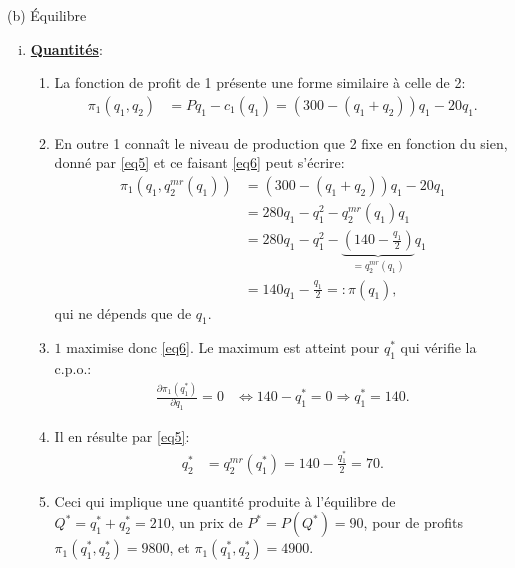 \begin{frame}[allowframebreaks]{(b) Équilibre}
    \begin{enumerate}[(i)]
        \item \textbf{\underline{Quantités}}: 
        \begin{enumerate}[-]
            \item La fonction de profit de 1 présente une forme similaire à celle de 2:
            \begin{align}
                \pi_1\left(q_1, q_2\right) &= Pq_1 - c_1(q_1) = \left(300-(q_1+q_2)\right)q_1 - 20q_1.
                \label{eq6}
            \end{align}
            \item En outre 1 connaît le niveau de production que 2 fixe en fonction du sien, 
            donné par \eqref{eq5} et ce faisant \eqref{eq6} peut s'écrire:
            \begin{align}
                \pi_1\left(q_1, q^{mr}_2(q_1)\right) &= \left(300-(q_1+q_2)\right)q_1 - 20q_1 \nonumber\\
                &= 280q_1 - q_1^2 - q^{mr}_2(q_1)q_1 \nonumber \\
                &= 280q_1 - q_1^2 - \underbrace{\left(140 - \frac{q_1}{2}\right)}_{=q^{mr}_2(q_1)}q_1\nonumber\\
                &= 140 q_1 - \frac{q_1}{2} =: \pi(q_1),
                \label{eq6}
            \end{align}
            qui ne dépends que de $q_1$. 
            \item $1$ maximise donc \eqref{eq6}. Le maximum est atteint pour $q_1^*$ qui vérifie la c.p.o.:  
            \begin{align}
                \frac{\partial \pi_1(q_1^*)}{\partial q_1} =0 & \Leftrightarrow 
                140 - q_1^* =0 \Rightarrow q_1^* = 140.
                \label{eq7}
            \end{align}
            \item Il en résulte par \eqref{eq5}:
            \begin{align*}
                q^*_2 &= q^{mr}_2(q_1^*) = 140 - \frac{q_1^*}{2}=70.
            \end{align*}
            \item Ceci qui implique une quantité produite à l'équilibre de $Q^* = q_1^* + q_2^* = 210$, 
            un prix de $P^* = P(Q^*) = 90$, pour de profits $\pi_1(q_1^*, q_2^*) = 9800$, et 
            $\pi_1(q_1^*, q_2^*) = 4900$.
        \end{enumerate}
    \end{enumerate}
\end{frame}

